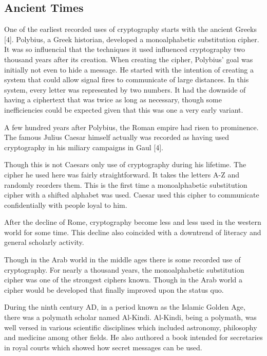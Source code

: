 \documentclass{article}
\begin{document}
    \subsection{Ancient Times}

    One of the earliest recorded uses of cryptography starts with the ancient Greeks [4].
    Polybius, a Greek historian, developed a monoalphabetic substitution cipher. It
    was so influencial that the techniques it used influenced cryptography two thousand
    years after its creation.
    When creating the cipher, Polybius' goal was initially not even to hide a message.
    He started with the intention of creating a system that could allow signal fires
    to communicate of large distances. In this system, every letter was represented
    by two numbers. It had the downside of having a ciphertext that was twice as long
    as necessary, though some inefficiencies could be expected given that this
    was one a very early variant.

    A few hundred years after Polybius, the Roman empire had risen to prominence.
    The famous Julius Caesar himself actually was recorded as having used cryptography
    in his miliary campaigns in Gaul [4].

    Though this is not Caesars only use of cryptography during his lifetime.
    The cipher he used here was fairly straightforward. It takes the letters A-Z
    and randomly reorders them. This is the first time a monoalphabetic substitution
    cipher with a shifted alphabet was used.
    Caesar used this cipher to communicate confidentially with people loyal to him.

    After the decline of Rome, cryptography become less and less used in the western
    world for some time.
    This decline also coincided with a downtrend of literacy and general scholarly activity.

    Though in the Arab world in the middle ages there is some recorded use of cryptography.
    For nearly a thousand years, the monoalphabetic substitution cipher was one
    of the strongest ciphers known. Though in the Arab world a cipher would be developed
    that finally improved upon the status quo.

    During the ninth century AD, in a period known as the Islamic Golden Age,
    there was a polymath scholar named Al-Kindi. Al-Kindi, being a polymath, was
    well versed in various scientific disciplines which included astronomy, philosophy
    and medicine among other fields. He also authored a book intended for
    secretaries in royal courts which showed how secret messages can be used.
\end{document}
